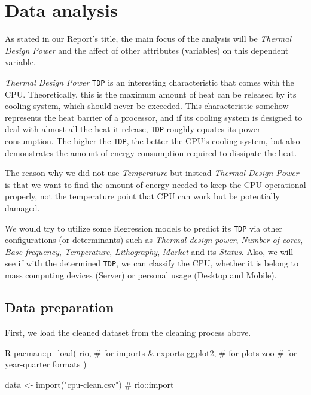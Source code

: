 %
%   
\section{Data analysis}
\label{section:data_analysis}

As stated in our Report's title, the main focus of the analysis will be \textit{Thermal Design Power} and the affect of
other attributes (variables) on this dependent variable.

\textit{Thermal Design Power} \verb|TDP| is an interesting characteristic that comes with the CPU. Theoretically, this is the
maximum amount of heat can be released by its cooling system, which should never be exceeded. This characteristic somehow
represents the heat barrier of a processor, and if its cooling system is designed to deal with almost all the heat it release,
\verb|TDP| roughly equates its power consumption. The higher the \verb|TDP|, the better the CPU's cooling system, but also 
demonstrates the amount of energy consumption required to dissipate the heat.

The reason why we did not use \textit{Temperature} but instead \textit{Thermal Design Power} is that we want to find the amount of
energy needed to keep the CPU operational properly, not the temperature point that CPU can work but be potentially damaged.

We would try to utilize some Regression models to predict its \verb|TDP| via other configurations (or determinants) such as
\textit{Thermal design power}, \textit{Number of cores}, \textit{Base frequency}, \textit{Temperature}, \textit{Lithography},
\textit{Market} and its \textit{Status}. Also, we will see if with the determined \verb|TDP|, we can classify the CPU, whether
it is belong to mass computing devices (Server) or personal usage (Desktop and Mobile).









\subsection{Data preparation}

First, we load the cleaned dataset from the cleaning process above.

\begin{code}{R}
pacman::p_load(
    rio,     # for imports & exports
    ggplot2, # for plots
    zoo      # for year-quarter formats
)

data <- import("cpu-clean.csv") # rio::import
\end{code}

